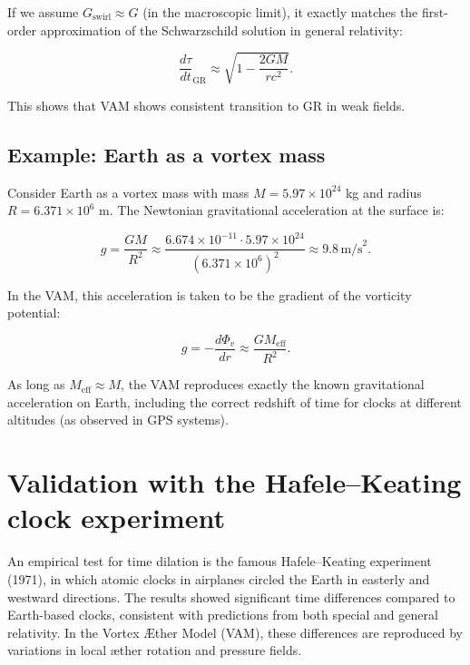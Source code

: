 If we assume $G_\text{swirl} \approx G$ (in the macroscopic limit), it exactly matches the first-order approximation of the Schwarzschild solution in general relativity:

\begin{equation}
    \frac{d\tau}{dt}_\text{GR} \approx \sqrt{1 - \frac{2GM}{rc^2}}.
\end{equation}

This shows that VAM shows consistent transition to GR in weak fields.

\subsection{Example: Earth as a vortex mass}

Consider Earth as a vortex mass with mass $M = 5.97 \times 10^{24}$ kg and radius $R = 6.371 \times 10^6$ m. The Newtonian gravitational acceleration at the surface is:

\begin{equation}
    g = \frac{G M}{R^2} \approx \frac{6.674 \times 10^{-11} \cdot 5.97 \times 10^{24}}{(6.371 \times 10^6)^2} \approx 9.8 \, \text{m/s}^2.
\end{equation}

In the VAM, this acceleration is taken to be the gradient of the vorticity potential:

\begin{equation}
    g = -\frac{d\Phi_v}{dr} \approx \frac{G M_\text{eff}}{R^2}.
\end{equation}

As long as $M_\text{eff} \approx M$, the VAM reproduces exactly the known gravitational acceleration on Earth, including the correct redshift of time for clocks at different altitudes (as observed in GPS systems).

\section{Validation with the Hafele–Keating clock experiment}

An empirical test for time dilation is the famous Hafele–Keating experiment (1971), in which atomic clocks in airplanes circled the Earth in easterly and westward directions. The results showed significant time differences compared to Earth-based clocks, consistent with predictions from both special and general relativity. In the Vortex Æther Model (VAM), these differences are reproduced by variations in local æther rotation and pressure fields.

